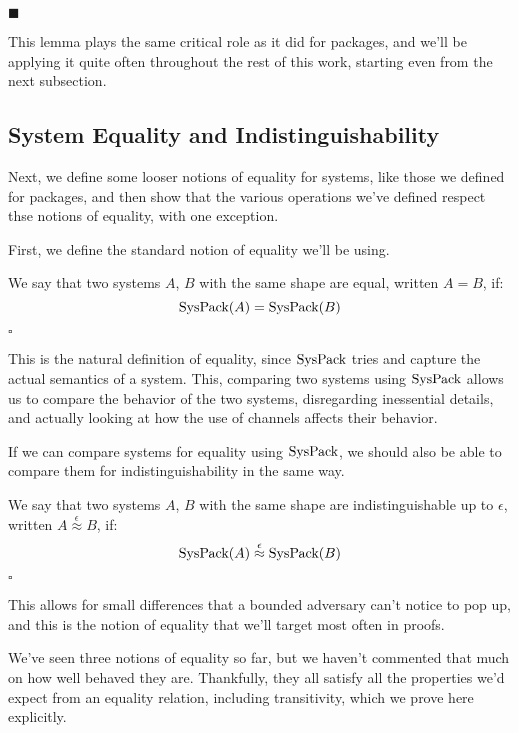 \begin{lemma}
$\blacksquare$
\end{lemma}

This lemma plays the same critical role as it did for packages,
and we'll be applying it quite often throughout the rest
of this work, starting even from the next subsection.

\subsection{System Equality and Indistinguishability}

Next, we define some looser notions of equality for systems,
like those we defined for packages,
and then show that the various operations we've defined
respect thse notions of equality, with one exception.

First, we define the standard notion of equality we'll be using.

\begin{definition}
  We say that two systems $A$, $B$ with the same shape are equal, written $A = B$,
  if:
  $$
  \text{SysPack}(A) = \text{SysPack}(B)
  $$

  $\square$
\end{definition}

This is the natural definition of equality, since $\text{SysPack}$
tries and capture the actual semantics of a system.
This, comparing two systems using $\text{SysPack}$ allows
us to compare the behavior of the two systems,
disregarding inessential details, and actually
looking at how the use of channels affects their behavior.

If we can compare systems for equality using $\text{SysPack}$,
we should also be able to compare them for indistinguishability
in the same way.

\begin{definition}
  We say that two systems $A$, $B$ with the same shape are indistinguishable up to $\epsilon$,
  written $A \overset{\epsilon}{\approx} B$,
  if:
  $$
  \text{SysPack}(A) \overset{\epsilon}{\approx} \text{SysPack}(B)
  $$

  $\square$
\end{definition}

This allows for small differences that a bounded adversary can't notice
to pop up, and this is the notion of equality that we'll
target most often in proofs.

We've seen three notions of equality so far, but we haven't commented
that much on how well behaved they are.
Thankfully, they all satisfy all the properties we'd
expect from an equality relation, including transitivity,
which we prove here explicitly.


